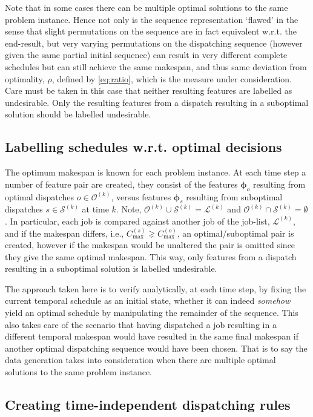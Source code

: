 \documentclass[smallextended]{svjour3}
\renewcommand{\vphi}{\bm \phi}
\begin{document}
Note that in some cases there can be multiple optimal solutions to the same 
problem instance. Hence not only is the sequence representation `flawed' in the 
sense that slight permutations on the sequence are in fact equivalent w.r.t. 
the end-result, but very varying permutations on the dispatching sequence 
(however given the same partial initial sequence) can result in very different 
complete schedules but can still achieve the same makespan, and thus same 
deviation from optimality, $\rho$, defined by \eqref{eq:ratio}, which is the 
measure under consideration. Care must be taken in this case that neither 
resulting features are labelled as undesirable. Only the resulting features 
from a dispatch resulting in a suboptimal solution should be labelled 
undesirable.

\subsection{Labelling schedules w.r.t. optimal decisions}
The optimum makespan is known for each problem instance. At each time step a 
number of feature pair are created, they consist of the features $\vphi_o$ 
resulting from optimal dispatches $o\in\mathcal{O}^{(k)}$, versus features 
$\vphi_s$ resulting from suboptimal dispatches $s\in\mathcal{S}^{(k)}$ at time 
$k$. Note, $\mathcal{O}^{(k)}\cup\mathcal{S}^{(k)}=\mathcal{L}^{(k)}$ and 
$\mathcal{O}^{(k)}\cap\mathcal{S}^{(k)}=\emptyset$.
In particular, each job is compared against another job of the job-list, 
$\mathcal{L}^{(k)}$, and if the makespan differs, i.e., $C_{\max}^{(s)}\gneq 
C_{\max}^{(o)}$, an optimal/suboptimal pair is created, however if the makespan 
would be unaltered the pair is omitted since they give the same optimal 
makespan. This way, only features from a dispatch resulting in a suboptimal 
solution is labelled undesirable.

The approach taken here is to verify analytically, at each time step, by fixing 
the current temporal schedule as an initial state, whether it can indeed 
\emph{somehow} yield an optimal schedule by manipulating the remainder of the 
sequence. This also takes care of the scenario that having dispatched a job 
resulting in a different temporal makespan would have resulted in the same 
final makespan if another optimal dispatching sequence would have been chosen. 
That is to say the data generation takes into consideration when there are 
multiple optimal solutions to the same problem instance. 

\subsection{Creating time-independent dispatching 
	rules}\label{sec:ord:timeindependent}
\end{document}
